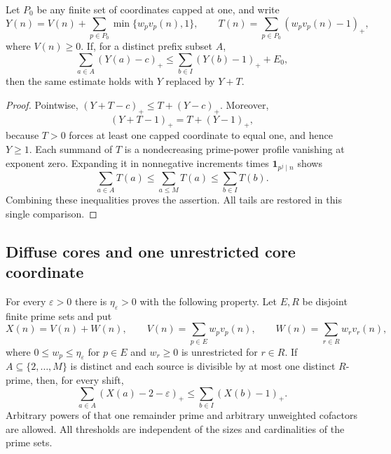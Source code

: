 \begin{lemma}
\label{cg:tails}
Let $P_0$ be any finite set of coordinates capped at one, and write
\[
 Y(n)=V(n)+\sum_{p\in P_0}\min\{w_pv_p(n),1\},\qquad
 T(n)=\sum_{p\in P_0}(w_pv_p(n)-1)_+,
\]
where $V(n)\ge0$. If, for a distinct prefix subset $A$,
\[
 \sum_{a\in A}(Y(a)-c)_+\le\sum_{b\in I}(Y(b)-1)_++E_0,
\]
then the same estimate holds with $Y$ replaced by $Y+T$.
\end{lemma}

\begin{proof}
Pointwise, $(Y+T-c)_+\le T+(Y-c)_+$. Moreover,
\[
 (Y+T-1)_+=T+(Y-1)_+,
\]
because $T>0$ forces at least one capped coordinate to equal one,
and hence $Y\ge1$. Each summand of $T$ is a nondecreasing
prime-power profile vanishing at exponent zero. Expanding it in
nonnegative increments times $\mathbf1_{p^j\mid n}$ shows
\[
 \sum_{a\in A}T(a)\le\sum_{a\le M}T(a)\le\sum_{b\in I}T(b).
\]
Combining these inequalities proves the assertion. All tails are
restored in this single comparison.
\end{proof}

\subsection{Diffuse cores and one unrestricted core coordinate}

\begin{theorem}
\label{thm:cg-diffuse}
For every $\varepsilon>0$ there is $\eta_\varepsilon>0$ with the
following property. Let $E,R$ be disjoint finite prime sets and put
\[
 X(n)=V(n)+W(n),\qquad
 V(n)=\sum_{p\in E}w_pv_p(n),\qquad
 W(n)=\sum_{r\in R}w_rv_r(n),
\]
where $0\le w_p\le\eta_\varepsilon$ for $p\in E$ and
$w_r\ge0$ is unrestricted for $r\in R$. If
$A\subseteq\{2,\ldots,M\}$ is distinct and each source is
divisible by at most one distinct $R$-prime, then, for every shift,
\begin{equation}
 \sum_{a\in A}(X(a)-2-\varepsilon)_+
 \le\sum_{b\in I}(X(b)-1)_+.
 \label{cg:diffuse-hinge}
\end{equation}
Arbitrary powers of that one remainder prime and arbitrary unweighted
cofactors are allowed. All thresholds are independent of the sizes and
cardinalities of the prime sets.
\end{theorem}

